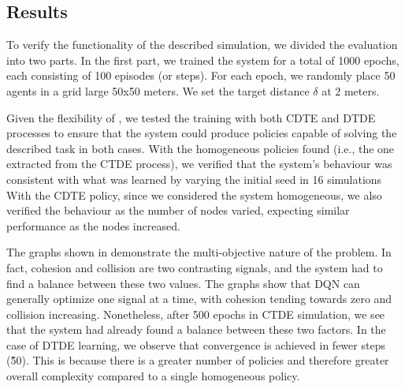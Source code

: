 \subsection{Results}
To verify the functionality of the described simulation, 
 we divided the evaluation into two parts. 
%
In the first part, 
 we trained the system for a total of 1000 epochs, 
 each consisting of 100 episodes (or steps). 
%
For each epoch,
 we randomly place 50 agents in a grid large 50x50 meters.
 We set the target distance $\delta$ at 2 meters.

Given the flexibility of \scarlib{}, 
 we tested the training with both CDTE and DTDE processes 
 to ensure that the system could produce policies 
 capable of solving the described task in both cases. 
% 
With the homogeneous policies found (i.e., the one extracted from the CTDE process), 
 we verified that the system's behaviour 
 was consistent with what was learned by varying the initial seed 
 in 16 simulations
%
With the CDTE policy, 
 since we considered the system homogeneous, 
 we also verified the behaviour as the number of nodes varied,
 expecting similar performance as the nodes increased.

The graphs shown in  
 demonstrate the multi-objective nature of the problem. 
In fact, cohesion and collision are two contrasting signals, 
 and the system had to find a balance between these two values. 
 The graphs show that DQN can generally optimize one signal at a time, 
 with cohesion tending towards zero and collision increasing. 
% 
Nonetheless, after 500 epochs in CTDE simulation,  
 we see that the system had already found a balance between these two factors.
%
In the case of DTDE learning, 
 we observe that convergence is achieved in fewer steps (\~ 50). 
 This is because there is a greater number of policies and 
 therefore greater overall complexity compared to a single homogeneous policy.

